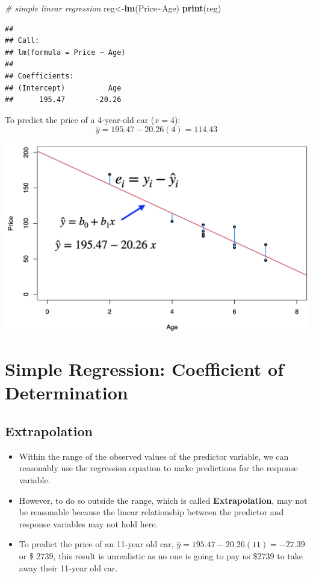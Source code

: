 \documentclass[
]{article}
\newenvironment{Shaded}{\begin{snugshade}}{\end{snugshade}}
\newcommand{\CommentTok}[1]{\textcolor[rgb]{0.56,0.35,0.01}{\textit{#1}}}
\newcommand{\FunctionTok}[1]{\textcolor[rgb]{0.13,0.29,0.53}{\textbf{#1}}}
\newcommand{\NormalTok}[1]{#1}
\newcommand{\OtherTok}[1]{\textcolor[rgb]{0.56,0.35,0.01}{#1}}
\newcommand{\SpecialCharTok}[1]{\textcolor[rgb]{0.81,0.36,0.00}{\textbf{#1}}}
\begin{document}
\begin{Shaded}
\begin{Highlighting}[]
\CommentTok{\# simple linear regression}
\NormalTok{reg}\OtherTok{\textless{}{-}}\FunctionTok{lm}\NormalTok{(Price}\SpecialCharTok{\textasciitilde{}}\NormalTok{Age)}
\FunctionTok{print}\NormalTok{(reg)}
\end{Highlighting}
\end{Shaded}

\begin{verbatim}
## 
## Call:
## lm(formula = Price ~ Age)
## 
## Coefficients:
## (Intercept)          Age  
##      195.47       -20.26
\end{verbatim}

To predict the price of a 4-year-old car (\(x=4\)):
\[\hat{y}=195.47-20.26(4)=114.43\]

\begin{center}\includegraphics[width=0.6\linewidth,height=0.6\textheight]{figures/leastsq3} \end{center}

\hypertarget{simple-regression-coefficient-of-determination-1}{%
\section{Simple Regression: Coefficient of
Determination}\label{simple-regression-coefficient-of-determination-1}}

\hypertarget{extrapolation-1}{%
\subsection{Extrapolation}\label{extrapolation-1}}

\begin{itemize}
\item
  Within the range of the observed values of the predictor variable, we
  can reasonably use the regression equation to make predictions for the
  response variable.
\item
  However, to do so outside the range, which is called
  \textbf{Extrapolation}, may not be reasonable because the linear
  relationship between the predictor and response variables may not hold
  here.
\item
  To predict the price of an 11-year old car,
  \(\hat{y}=195.47-20.26 (11)=-27.39\) or \$ 2739, this result is
  unrealistic as no one is going to pay us \$2739 to take away their
  11-year old car.
\end{itemize}
\end{document}
